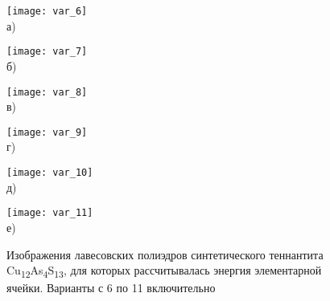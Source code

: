 \begin{figure}[p!]
  \begin{minipage}[ht]{0.45\linewidth}\centering
    \texttt{[image: var\_6]} \\ а)
  \end{minipage}
						\hfill
 \begin{minipage}[ht]{0.45\linewidth}\centering
    \texttt{[image: var\_7]} \\ б)
  \end{minipage}
\vfill

  \begin{minipage}[ht]{0.45\linewidth}\centering
    \texttt{[image: var\_8]} \\ в)
  \end{minipage}
						\hfill
 \begin{minipage}[ht]{0.45\linewidth}\centering
    \texttt{[image: var\_9]} \\ г)
  \end{minipage}
\vfill

  \begin{minipage}[ht]{0.45\linewidth}\centering
    \texttt{[image: var\_10]} \\ д)
  \end{minipage}
						\hfill
 \begin{minipage}[ht]{0.45\linewidth}\centering
    \texttt{[image: var\_11]} \\ е)
  \end{minipage}
      \caption[Изображения лавесовских полиэдров синтетического теннантита Cu\textsubscript{12}As\textsubscript{4}S\textsubscript{13}, для которых рассчитывалась энергия элементарной ячейки. Варианты с 6 по 11 включительно]{Изображения лавесовских полиэдров синтетического теннантита Cu\textsubscript{12}As\textsubscript{4}S\textsubscript{13}, для которых рассчитывалась энергия элементарной ячейки. Варианты с 6 по 11 включительно}
    \label{img:laves2}
\end{figure}



